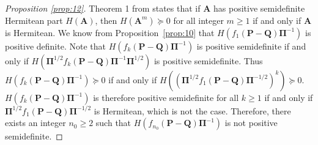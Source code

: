\documentclass[10pt,twocolumn]{article}
\numberwithin{equation}{section}
\begin{document}
\begin{proof}[Proposition \ref{prop:12}]
  Theorem 1 from \cite{johnson75:_power_matric_posit_defin_real_part}
  states that if $\mathbf{A}$ has positive semidefinite Hermitean part
  $H(\mathbf{A})$, then $H(\mathbf{A}^{m}) \succeq 0$ for all integer
  $m \geq 1$ if and only if $\mathbf{A}$ is Hermitean. We know from
  Proposition~\ref{prop:10} that $H(f_1(\mathbf{P} -
  \mathbf{Q})\bm{\Pi}^{-1})$ is positive definite. Note that
  $H(f_{k}(\mathbf{P} - \mathbf{Q})\bm{\Pi}^{-1})$ is positive
  semidefinite if and only if $H(\bm{\Pi}^{1/2}f_{k}(\mathbf{P} -
  \mathbf{Q}) \bm{\Pi}^{-1} \bm{\Pi}^{1/2})$ is positive
  semidefinite. Thus $H(f_{k}(\mathbf{P} - \mathbf{Q})\bm{\Pi}^{-1})
  \succeq 0$ if and only if $H((\bm{\Pi}^{1/2}f_{1}(\mathbf{P} -
  \mathbf{Q})\bm{\Pi}^{-1/2})^{k}) \succeq 0$.  $H(f_{k}(\mathbf{P} -
  \mathbf{Q})\bm{\Pi}^{-1})$ is therefore positive semidefinite for
  all $k \geq 1$ if and only if $\bm{\Pi}^{1/2}f_{1}(\mathbf{P} -
  \mathbf{Q})\bm{\Pi}^{-1/2}$ is Hermitean, which is not the
  case. Therefore, there exists an integer $n_0 \geq 2$ such that
  $H(f_{n_0}(\mathbf{P} - \mathbf{Q})\bm{\Pi}^{-1})$ is not positive
  semidefinite.
\end{proof}

\end{document}
